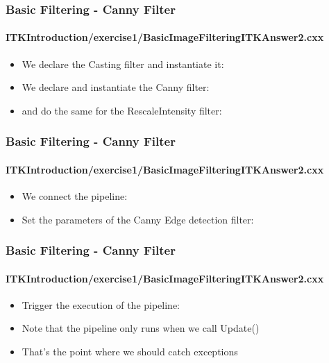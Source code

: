 \begin{frame}
\frametitle{Basic Filtering - Canny Filter}
\framesubtitle{ITKIntroduction/exercise1/BasicImageFilteringITKAnswer2.cxx}
\begin{itemize}
\item We declare the Casting filter and instantiate it:
\pause
{}
\pause
\item We declare and instantiate the Canny filter:
\pause
{}
\pause
\item and do the same for the RescaleIntensity filter:
\pause
{}
\end{itemize}
\end{frame}

\begin{frame}
\frametitle{Basic Filtering - Canny Filter}
\framesubtitle{ITKIntroduction/exercise1/BasicImageFilteringITKAnswer2.cxx}
\begin{itemize}
\item We connect the pipeline:
\pause
{}
\pause
\item Set the parameters of the Canny Edge detection filter:
\pause
{}
\end{itemize}
\end{frame}

\begin{frame}
\frametitle{Basic Filtering - Canny Filter}
\framesubtitle{ITKIntroduction/exercise1/BasicImageFilteringITKAnswer2.cxx}
\begin{itemize}
\item Trigger the execution of the pipeline:
\pause
{}
\pause
\item Note that the pipeline only runs when we call Update()
\pause
\item That's the point where we should catch exceptions
\end{itemize}
\end{frame}

